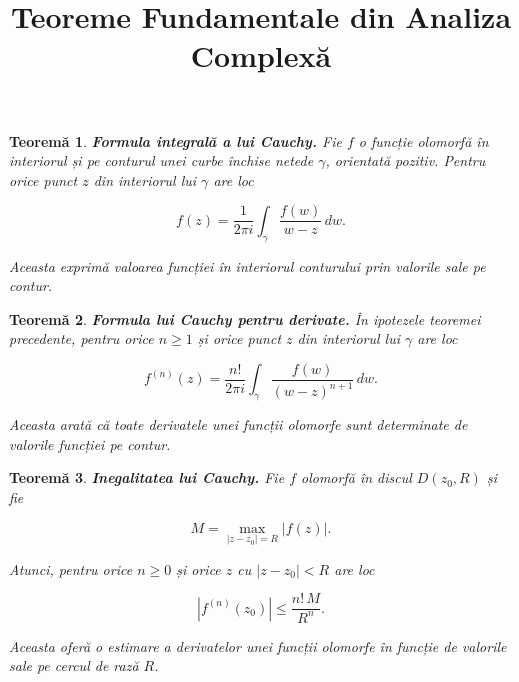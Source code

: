 \documentclass[12pt]{article}
\title{Teoreme Fundamentale din Analiza Complexă}
\author{}
\date{}
\theoremstyle{plain}
\newtheorem{theorem}{Teoremă}
\begin{document}
\maketitle

\begin{theorem}
\textbf{Formula integrală a lui Cauchy.}  
Fie $f$ o funcție olomorfă în interiorul și pe conturul unei curbe închise netede $\gamma$, orientată pozitiv.  
Pentru orice punct $z$ din interiorul lui $\gamma$ are loc



\[
f(z) = \frac{1}{2\pi i} \int_{\gamma} \frac{f(w)}{w - z} \, dw.
\]



Aceasta exprimă valoarea funcției în interiorul conturului prin valorile sale pe contur.
\end{theorem}

\begin{theorem}
\textbf{Formula lui Cauchy pentru derivate.}  
În ipotezele teoremei precedente, pentru orice $n \ge 1$ și orice punct $z$ din interiorul lui $\gamma$ are loc



\[
f^{(n)}(z) = \frac{n!}{2\pi i} \int_{\gamma} \frac{f(w)}{(w - z)^{n+1}} \, dw.
\]



Aceasta arată că toate derivatele unei funcții olomorfe sunt determinate de valorile funcției pe contur.
\end{theorem}

\begin{theorem}
\textbf{Inegalitatea lui Cauchy.}  
Fie $f$ olomorfă în discul $D(z_0, R)$ și fie



\[
M = \max_{|z - z_0| = R} |f(z)|.
\]



Atunci, pentru orice $n \ge 0$ și orice $z$ cu $|z - z_0| < R$ are loc



\[
|f^{(n)}(z_0)| \le \frac{n! \, M}{R^n}.
\]



Aceasta oferă o estimare a derivatelor unei funcții olomorfe în funcție de valorile sale pe cercul de rază $R$.
\end{theorem}
\end{document}
